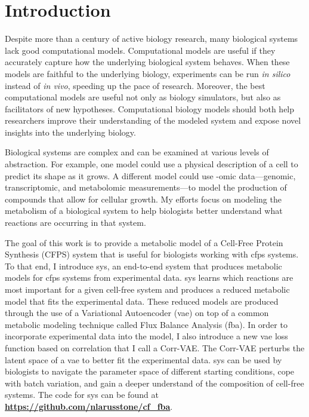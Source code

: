\chapter{Introduction}
\setcounter{page}{1} 

Despite more than a century of active biology research, many biological systems lack good computational models.
Computational models are useful if they accurately capture how the underlying biological system behaves.
When these models are faithful to the underlying biology, experiments can be run \textit{in silico} instead of \textit{in vivo}, speeding up the pace of research.
Moreover, the best computational models are useful not only as biology simulators, but also as facilitators of new hypotheses.
Computational biology models should both help researchers improve their understanding of the modeled system and expose novel insights into the underlying biology.

Biological systems are complex and can be examined at various levels of abstraction.
For example, one model could use a physical description of a cell to predict its shape as it grows.
A different model could use -omic data---genomic, transcriptomic, and metabolomic measurements---to model the production of compounds that allow for cellular growth.
My efforts focus on modeling the metabolism of a biological system to help biologists better understand what reactions are occurring in that system.

The goal of this work is to provide a metabolic model of a Cell-Free Protein Synthesis (CFPS) system that is useful for biologists working with \gls{cfps} systems.
To that end, I introduce \gls{sys}, an end-to-end system that produces metabolic models for \gls{cfps} systems from experimental data.
\gls{sys} learns which reactions are most important for a given cell-free system and produces a reduced metabolic model that fits the experimental data.
These reduced models are produced through the use of a Variational Autoencoder (\gls{vae}) on top of a common metabolic modeling technique called Flux Balance Analysis (\gls{fba}).
In order to incorporate experimental data into the model, I also introduce a new \gls{vae} loss function based on correlation that I call a Corr-VAE.
The Corr-VAE perturbs the latent space of a \gls{vae} to better fit the experimental data.
\gls{sys} can be used by biologists to navigate the parameter space of different starting conditions, cope with batch variation, and gain a deeper understand of the composition of cell-free systems.
The code for \gls{sys} can be found at \textbf{\url{https://github.com/nlarusstone/cf\_fba}}.

